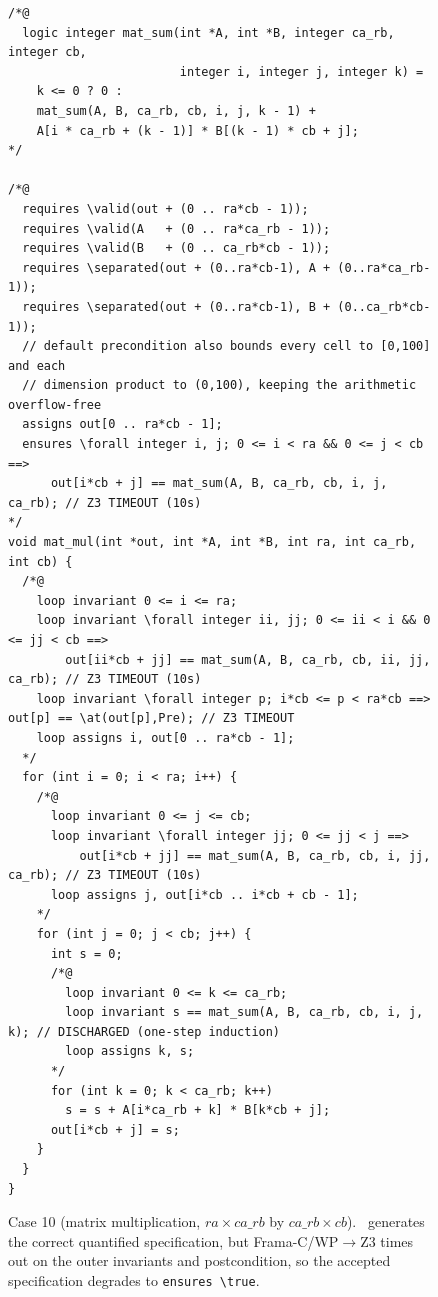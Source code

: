\begin{figure}[!b]
    \centering
    \begin{tcolorbox}[casebox, title={Case 10: matrix-multiplication proof boundary}, width=\linewidth]
\begin{lstlisting}[style=casecompactinnerstyle]
/*@
  logic integer mat_sum(int *A, int *B, integer ca_rb, integer cb,
                        integer i, integer j, integer k) =
    k <= 0 ? 0 :
    mat_sum(A, B, ca_rb, cb, i, j, k - 1) +
    A[i * ca_rb + (k - 1)] * B[(k - 1) * cb + j];
*/

/*@
  requires \valid(out + (0 .. ra*cb - 1));
  requires \valid(A   + (0 .. ra*ca_rb - 1));
  requires \valid(B   + (0 .. ca_rb*cb - 1));
  requires \separated(out + (0..ra*cb-1), A + (0..ra*ca_rb-1));
  requires \separated(out + (0..ra*cb-1), B + (0..ca_rb*cb-1));
  // default precondition also bounds every cell to [0,100] and each
  // dimension product to (0,100), keeping the arithmetic overflow-free
  assigns out[0 .. ra*cb - 1];
  ensures \forall integer i, j; 0 <= i < ra && 0 <= j < cb ==>
      out[i*cb + j] == mat_sum(A, B, ca_rb, cb, i, j, ca_rb); // Z3 TIMEOUT (10s)
*/
void mat_mul(int *out, int *A, int *B, int ra, int ca_rb, int cb) {
  /*@
    loop invariant 0 <= i <= ra;
    loop invariant \forall integer ii, jj; 0 <= ii < i && 0 <= jj < cb ==>
        out[ii*cb + jj] == mat_sum(A, B, ca_rb, cb, ii, jj, ca_rb); // Z3 TIMEOUT (10s)
    loop invariant \forall integer p; i*cb <= p < ra*cb ==> out[p] == \at(out[p],Pre); // Z3 TIMEOUT
    loop assigns i, out[0 .. ra*cb - 1];
  */
  for (int i = 0; i < ra; i++) {
    /*@
      loop invariant 0 <= j <= cb;
      loop invariant \forall integer jj; 0 <= jj < j ==>
          out[i*cb + jj] == mat_sum(A, B, ca_rb, cb, i, jj, ca_rb); // Z3 TIMEOUT (10s)
      loop assigns j, out[i*cb .. i*cb + cb - 1];
    */
    for (int j = 0; j < cb; j++) {
      int s = 0;
      /*@
        loop invariant 0 <= k <= ca_rb;
        loop invariant s == mat_sum(A, B, ca_rb, cb, i, j, k); // DISCHARGED (one-step induction)
        loop assigns k, s;
      */
      for (int k = 0; k < ca_rb; k++)
        s = s + A[i*ca_rb + k] * B[k*cb + j];
      out[i*cb + j] = s;
    }
  }
}
\end{lstlisting}
    \end{tcolorbox}
    \caption{Case 10 (matrix multiplication, $\mathit{ra}\times\mathit{ca\_rb}$ by $\mathit{ca\_rb}\times\mathit{cb}$). \toolname\ generates the correct quantified specification, but Frama-C/WP$\rightarrow$Z3 times out on the outer invariants and postcondition, so the accepted specification degrades to \texttt{ensures \textbackslash true}.}
    \label{fig:case-matmul}
\end{figure}

